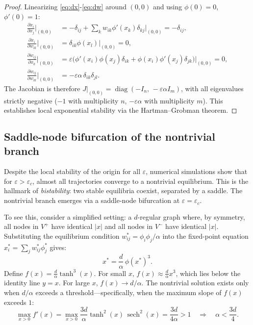 \documentclass[3p]{elsarticle}
\DeclareMathOperator{\sech}{sech}
\begin{document}
\begin{proof}
Linearizing \eqref{eq:dx}-\eqref{eq:dw} around $(0,0)$ and using $\phi(0)=0$, $\phi'(0)=1$:
\begin{align*}
  \frac{\partial \dot x_i}{\partial x_j}\Big|_{(0,0)} &= -\delta_{ij} + \sum_{k} w_{ik}\phi'(x_k)\delta_{kj}\Big|_{(0,0)} = -\delta_{ij},\\[4pt]
  \frac{\partial \dot x_i}{\partial w_{kl}}\Big|_{(0,0)} &= \delta_{ik}\phi(x_l)\Big|_{(0,0)} = 0,\\[4pt]
  \frac{\partial \dot w_{ij}}{\partial x_k}\Big|_{(0,0)} &= \varepsilon\bigl(\phi'(x_i)\phi(x_j)\delta_{ik} + \phi(x_i)\phi'(x_j)\delta_{jk}\bigr)\Big|_{(0,0)} = 0,\\[4pt]
  \frac{\partial \dot w_{ij}}{\partial w_{kl}}\Big|_{(0,0)} &= -\varepsilon\alpha\,\delta_{ik}\delta_{jl}.
\end{align*}
The Jacobian is therefore $J|_{(0,0)} = \operatorname{diag}(-I_n,\, -\varepsilon\alpha I_m)$, with all eigenvalues strictly negative ($-1$ with multiplicity $n$, $-\varepsilon\alpha$ with multiplicity $m$). This establishes local exponential stability via the Hartman--Grobman theorem.
\end{proof}

\subsection{Saddle-node bifurcation of the nontrivial branch}

Despite the local stability of the origin for all $\varepsilon$, numerical simulations show that for $\varepsilon > \varepsilon_c$, almost all trajectories converge to a nontrivial equilibrium. This is the hallmark of \emph{bistability}: two stable equilibria coexist, separated by a saddle. The nontrivial branch emerges via a saddle-node bifurcation at $\varepsilon=\varepsilon_c$.

To see this, consider a simplified setting: a $d$-regular graph where, by symmetry, all nodes in $V^+$ have identical $|x|$ and all nodes in $V^-$ have identical $|x|$. Substituting the equilibrium condition $w_{ij}^* = \phi_i\phi_j/\alpha$ into the fixed-point equation $x_i^* = \sum_j w_{ij}^*\phi_j^*$ gives:
\begin{equation}
  x^* = \frac{d}{\alpha}\,\phi(x^*)^3. \label{eq:fixedpoint}
\end{equation}
Define $f(x) = \frac{d}{\alpha}\tanh^3(x)$. For small $x$, $f(x) \approx \frac{d}{\alpha}x^3$, which lies below the identity line $y=x$. For large $x$, $f(x) \to d/\alpha$. The nontrivial solution exists only when $d/\alpha$ exceeds a threshold---specifically, when the maximum slope of $f(x)$ exceeds $1$:
\begin{equation}
  \max_{x>0} f'(x) = \max_{x>0} \frac{3d}{\alpha}\tanh^2(x)\,\sech^2(x) = \frac{3d}{4\alpha} > 1 \quad\Longrightarrow\quad \alpha < \frac{3d}{4}. \label{eq:cond}
\end{equation}
\end{document}
